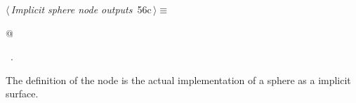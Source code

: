 \documentclass[
    a4paper,      %
    10pt,         %
    openright,    %
    notitlepage,  %
    parskip=half, %
]{scrreprt}       %
\theoremstyle{definition}                    %
\begin{document}
\begin{flushleft} \small
\begin{minipage}{\linewidth}\label{scrap92}\raggedright\small
{} $\langle\,${\itshape Implicit sphere node outputs}\nobreak\ {\footnotesize {56c}}$\,\rangle\equiv$
\vspace{-1exm}
\begin{list}{}{} \item
\mbox{}@{\NWsep}
\end{list}
\vspace{-1.5ex}
\footnotesize
\begin{list}{}{\setlength{\itemsep}{-\parsep}\setlength{\itemindent}{-\leftmargin}}
\item \NWtxtMacroRefIn\ .

\item{}
\end{list}
\end{minipage}\vspace{4ex}
\end{flushleft}
The definition of the node is the actual implementation of a sphere as a
implicit surface.
\end{document}
